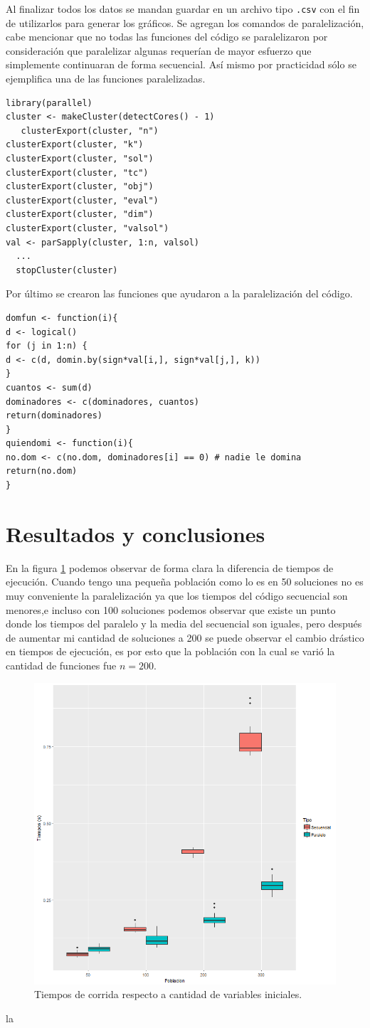 \documentclass[a4paper]{article}
\begin{document}
Al finalizar todos los datos se mandan guardar en un archivo tipo \texttt{.csv} con el fin de utilizarlos para generar los gráficos. Se agregan los comandos de paralelización, cabe mencionar que no todas las funciones del código se paralelizaron por consideración que paralelizar algunas requerían de mayor esfuerzo que simplemente continuaran de forma secuencial. Así mismo por practicidad sólo se ejemplifica una de las funciones paralelizadas.
\begin{lstlisting}[frame=single]
library(parallel)
cluster <- makeCluster(detectCores() - 1)
   clusterExport(cluster, "n")
clusterExport(cluster, "k")
clusterExport(cluster, "sol")
clusterExport(cluster, "tc")
clusterExport(cluster, "obj")
clusterExport(cluster, "eval")
clusterExport(cluster, "dim")
clusterExport(cluster, "valsol")
val <- parSapply(cluster, 1:n, valsol)
  ...
  stopCluster(cluster)
\end{lstlisting}

Por último se crearon las funciones que ayudaron a la paralelización del código.

\begin{lstlisting}[frame=single]
  domfun <- function(i){
d <- logical()
for (j in 1:n) {
d <- c(d, domin.by(sign*val[i,], sign*val[j,], k))
}
cuantos <- sum(d)
dominadores <- c(dominadores, cuantos)
return(dominadores)
}
quiendomi <- function(i){
no.dom <- c(no.dom, dominadores[i] == 0) # nadie le domina
return(no.dom)
}
\end{lstlisting}


\section{Resultados y conclusiones}
En la figura \ref{fig:ambos} podemos observar de forma clara la diferencia de tiempos de ejecución. Cuando tengo una pequeña población como lo es en 50 soluciones no es muy conveniente la paralelización ya que los tiempos del código secuencial son menores,e incluso con 100 soluciones podemos observar que existe un punto donde los tiempos del paralelo y la media del secuencial son iguales, pero después de aumentar mi cantidad de soluciones a 200 se puede observar el cambio drástico en tiempos de ejecución, es por esto que la población con la cual se varió la cantidad de funciones fue $n=200$.

\begin{figure}[h!]
\centering
\includegraphics[width=0.7\linewidth]{ambos}
\caption{Tiempos de corrida respecto a cantidad de variables iniciales.}
\label{fig:ambos}
\end{figure}

la
\end{document}
